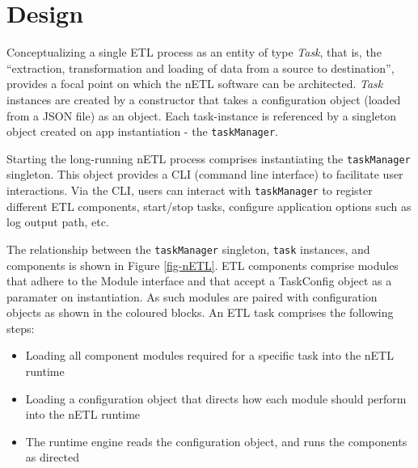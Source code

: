 \section{Design}
Conceptualizing a single ETL process as an entity of type \textit{Task}, that is, the ``extraction, transformation and loading of data from a source to destination'', provides a focal point on which the nETL software can be architected. \textit{Task} instances are created by a constructor that takes a configuration object (loaded from a JSON file) as an object. Each task-instance is referenced by a singleton object created on app instantiation - the \texttt{taskManager}.

Starting the long-running nETL process comprises instantiating the \texttt{taskManager} singleton. This object provides a CLI (command line interface) to facilitate user interactions. Via the CLI, users can interact with \texttt{taskManager} to register different ETL components, start/stop tasks, configure application options such as log output path, etc.

The relationship between the \texttt{taskManager} singleton, \texttt{task} instances, and components is shown in Figure \ref{fig-nETL}. ETL components comprise modules that adhere to the Module interface and that accept a TaskConfig object as a paramater on instantiation. As such modules are paired with configuration objects as shown in the coloured blocks. An ETL task comprises the following steps:

\begin{itemize}
    \item Loading all component modules required for a specific task into the nETL runtime
    \item Loading a configuration object that directs how each module should perform into the nETL runtime
    \item The runtime engine reads the configuration object, and runs the components as directed
\end{itemize}

